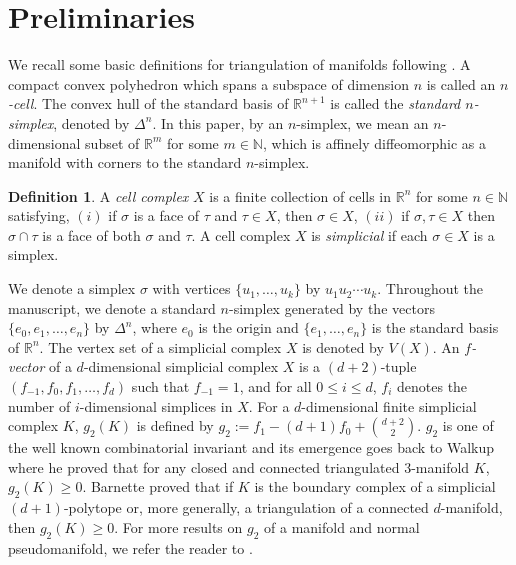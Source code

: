 \documentclass[11pt]{amsart}
\numberwithin{equation}{section}
\theoremstyle{definition}
\newtheorem{defn}[theorem]{Definition}
\def \bb{\mathbb}
\def \RR{{\bb{R}}}
\begin{document}
\section{Preliminaries}\label{pritri}
We recall some basic definitions for triangulation of manifolds following \cite{RS}.
A compact convex polyhedron which spans a subspace of dimension $n$ is called an {\em $n$-cell}. The convex hull of the standard basis of $\RR^{n+1}$ is called the {\it standard $n$-simplex}, denoted by $\Delta^n$. In this paper, by an $n$-simplex, we mean an $n$-dimensional subset of $\RR^m$ for some $m\in\mathbb{N}$, which is affinely diffeomorphic as a manifold with corners to the standard $n$-simplex.
\begin{defn}
A {\em cell complex} $X$ is a finite collection of cells in $\RR^n$ for some $n\in \mathbb{N}$ satisfying,
$(i)$ if $\sigma$ is a face of $\tau$ and $\tau \in X$, then $\sigma \in X$, $(ii)$ if $\sigma, \tau \in X$
then $\sigma \cap \tau$ is a face of both $\sigma$ and $\tau$. A cell complex $X$ is {\em simplicial} if each $\sigma \in X$ is a simplex.
\end{defn}
We denote a simplex $\sigma$ with vertices $ \{u_1, \ldots, u_k\}$ by $u_1u_2\cdots u_k$. Throughout the manuscript, we denote a standard $n$-simplex generated by the vectors $\{e_0,e_1,\ldots, e_n\}$ by $\Delta^n$, where $e_0$ is the origin and $\{e_1,\ldots,e_n\}$ is the standard basis of $\RR^n$.
The vertex set of a simplicial complex $X$ is denoted by $V(X)$. An {\em $f$-vector} of a $d$-dimensional simplicial complex $X$ is a $(d+2)$-tuple $(f_{-1}, f_0, f_1, \ldots, f_d)$ such that $f_{-1} = 1$, and for all $0 \leq i \leq d$, $f_i$ denotes the number of $i$-dimensional simplices in $X$.  For a $d$-dimensional finite simplicial complex $K$, $g_2(K)$ is defined by  $g_2:=f_1-(d+1)f_0 + \binom{d+2}{2}$. $g_2$ is one of the well known combinatorial invariant and its emergence goes back to  Walkup \cite{Walkup} where he proved that for any closed and connected triangulated $3$-manifold $K$, $g_2(K)\geq 0$. Barnette \cite{Barnette1, Barnette2, Barnette3} proved that if $K$ is the boundary complex of a simplicial $(d+1)$-polytope or, more generally, a triangulation of a connected $d$-manifold, then $g_2(K)\geq 0$. For more results on $g_2$ of a manifold and normal pseudomanifold, we refer the reader to \cite{BSR1}.
\end{document}
